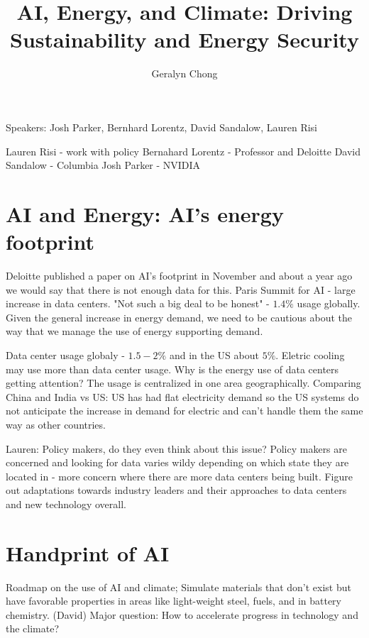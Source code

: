 \documentclass{article}
\title{AI, Energy, and Climate: Driving Sustainability and Energy Security}
\author{Geralyn Chong}
\begin{document}
\maketitle
\tableofcontents
Speakers: Josh Parker, Bernhard Lorentz, David Sandalow, Lauren Risi

Lauren Risi - work with policy
Bernahard Lorentz - Professor and Deloitte
David Sandalow - Columbia
Josh Parker - NVIDIA

\section{AI and Energy: AI's energy footprint}
Deloitte published a paper on AI's footprint in November and about a year ago we would say that there is not enough data for this. Paris Summit for AI - large increase in data centers. "Not such a big deal to be honest" - $1.4\%$ usage globally. Given the general increase in energy demand, we need to be cautious about the way that we manage the use of energy supporting demand. 

Data center usage globaly - $1.5 - 2\%$ and in the US about $5\%$. Eletric cooling may use more than data center usage. Why is the energy use of data centers getting attention? The usage is centralized in one area geographically. Comparing China and India vs US: US has had flat electricity demand so the US systems do not anticipate the increase in demand for electric and can't handle them the same way as other countries.

Lauren: Policy makers, do they even think about this issue? Policy makers are concerned and looking for data varies wildy depending on which state they are located in - more concern where there are more data centers being built. Figure out adaptations towards industry leaders and their approaches to data centers and new technology overall. 

\section{Handprint of AI}
Roadmap on the use of AI and climate; Simulate materials that don't exist but have favorable properties in areas like light-weight steel, fuels, and in battery chemistry. (David) Major question: How to accelerate progress in technology and the climate? 
\end{document}
